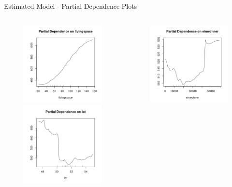 \documentclass[11pt]{beamer}\usepackage[]{graphicx}\usepackage[]{color}
\begin{document}
\begin{frame}{Estimated Model - Partial Dependence Plots}
\begin{columns}[t]
    \begin{column}{.5\linewidth}
        \begin{figure}\centering
        \includegraphics[width=0.6\linewidth]{Partial_Dependence_livingspace.png}\\
        \includegraphics[width=0.6\linewidth]{Partial_Dependence_lat.png}
        \end{figure}
\end{column}
\begin{column}{.5\linewidth}
       \begin{figure}\centering
        \includegraphics[width=0.6\linewidth]{Partial_Dependence_einwohner.png}\\

\end{figure}
\end{column}
\end{columns}
\end{frame}
\end{document}
